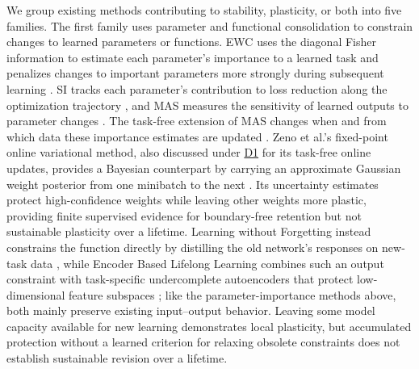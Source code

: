 \documentclass[10pt,journal,compsoc]{IEEEtran}
\DeclareRobustCommand{\Dref}[1]{\hyperref[sec:d#1]{D#1}}
\begin{document}
We group existing methods contributing to stability, plasticity, or both into five families.
The first family uses parameter and functional consolidation to constrain changes to learned parameters or functions.
EWC uses the diagonal Fisher information to estimate each parameter's importance to a learned task and penalizes changes to important parameters more strongly during subsequent learning \cite{kirkpatrick2017,huszar2018}.
SI tracks each parameter's contribution to loss reduction along the optimization trajectory \cite{zenke2017}, and MAS measures the sensitivity of learned outputs to parameter changes \cite{aljundi2018}.
The task-free extension of MAS changes when and from which data these importance estimates are updated \cite{aljundi2019}.
Zeno et al.'s fixed-point online variational method, also discussed under \Dref{1} for its task-free online updates, provides a Bayesian counterpart by carrying an approximate Gaussian weight posterior from one minibatch to the next \cite{zeno2021}.
Its uncertainty estimates protect high-confidence weights while leaving other weights more plastic, providing finite supervised evidence for boundary-free retention but not sustainable plasticity over a lifetime.
Learning without Forgetting instead constrains the function directly by distilling the old network's responses on new-task data \cite{li2018}, while Encoder Based Lifelong Learning combines such an output constraint with task-specific undercomplete autoencoders that protect low-dimensional feature subspaces \cite{rannen2017}; like the parameter-importance methods above, both mainly preserve existing input--output behavior.
Leaving some model capacity available for new learning demonstrates local plasticity, but accumulated protection without a learned criterion for relaxing obsolete constraints does not establish sustainable revision over a lifetime.
\end{document}
